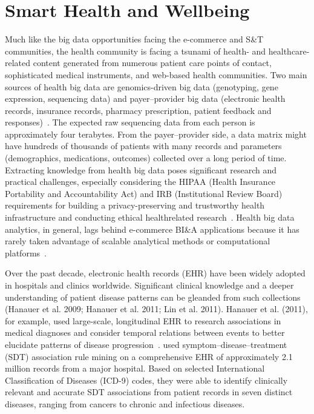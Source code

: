 \section{Smart Health and Wellbeing}
Much like the big data opportunities facing the e-commerce
and S\&T communities, the health community is facing a
tsunami of health- and healthcare-related content generated
from numerous patient care points of contact, sophisticated
medical instruments, and web-based health communities.
Two main sources of health big data are genomics-driven big
data (genotyping, gene expression, sequencing data) and
payer–provider big data (electronic health records, insurance
records, pharmacy prescription, patient feedback and
responses)~\cite{Miller:2012a}. The expected raw sequencing data
from each person is approximately four terabytes. From the
payer–provider side, a data matrix might have hundreds of
thousands of patients with many records and parameters
(demographics, medications, outcomes) collected over a long
period of time. Extracting knowledge from health big data
poses significant research and practical challenges, especially
considering the HIPAA (Health Insurance Portability and
Accountability Act) and IRB (Institutional Review Board)
requirements for building a privacy-preserving and trustworthy
health infrastructure and conducting ethical healthrelated
research~\cite{Gelfand:2012}. Health big data analytics,
in general, lags behind e-commerce BI\&A applications
because it has rarely taken advantage of scalable analytical
methods or computational platforms~\cite{Miller:2012a}.

Over the past decade, electronic health records (EHR) have
been widely adopted in hospitals and clinics worldwide.
Significant clinical knowledge and a deeper understanding of
patient disease patterns can be gleanded from such collections
(Hanauer et al. 2009; Hanauer et al. 2011; Lin et al. 2011).
Hanauer et al. (2011), for example, used large-scale, longitudinal
EHR to research associations in medical diagnoses
and consider temporal relations between events to better
elucidate patterns of disease progression~\cite{Lin:2011}.
used symptom–disease–treatment (SDT) association rule
mining on a comprehensive EHR of approximately 2.1
million records from a major hospital. Based on selected
International Classification of Diseases (ICD-9) codes, they
were able to identify clinically relevant and accurate SDT
associations from patient records in seven distinct diseases,
ranging from cancers to chronic and infectious diseases.

